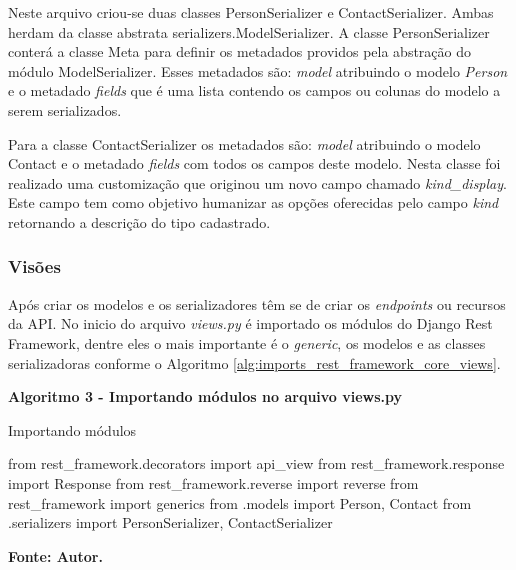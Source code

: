   Neste arquivo criou-se duas classes PersonSerializer e ContactSerializer. Ambas herdam da classe abstrata serializers.ModelSerializer.
  A classe PersonSerializer conterá a classe Meta para definir os metadados providos pela abstração do módulo ModelSerializer. Esses 
  metadados são: \textit{model} atribuindo o modelo \textit{Person} e o metadado \textit{fields} que é uma lista contendo os campos ou colunas
  do modelo a serem serializados.
  
  Para a classe ContactSerializer os metadados são: \textit{model} atribuindo o modelo Contact e o metadado \textit{fields} com todos os
  campos deste modelo. Nesta classe foi realizado uma customização que originou um novo campo chamado \textit{kind\_display}. Este campo
  tem como objetivo humanizar as opções oferecidas pelo campo \textit{kind} retornando a descrição do tipo cadastrado.

\subsubsection{Visões}

  Após criar os modelos e os serializadores têm se de criar os \textit{endpoints} ou recursos da API. No inicio
  do arquivo \textit{views.py} é importado os módulos do Django Rest Framework, dentre eles o mais importante
  é o \textit{generic}, os modelos e as classes serializadoras conforme o Algoritmo \ref{alg:imports_rest_framework_core_views}.
  \begin{center}	
    \textbf{Algoritmo 3 -  Importando módulos no arquivo views.py}
    \vspace{-0.3cm}
    \begin{minipage}[ht]{13cm}
      \begin{algorithm}[H]
      \footnotesize
      \caption{Importando módulos}
      \label{alg:imports_rest_framework_core_views}
	\begin{algorithmic}[1]
	  \STATE from rest\_framework.decorators import api\_view
	  \STATE from rest\_framework.response import Response
	  \STATE from rest\_framework.reverse import reverse
	  \STATE from rest\_framework import generics
	  \STATE from .models import Person, Contact 
	  \STATE from .serializers import PersonSerializer, ContactSerializer
	\end{algorithmic}
      \end{algorithm}

      \small \centering \textbf{\footnotesize Fonte: Autor.}
    \end{minipage}
  \end{center}
  
